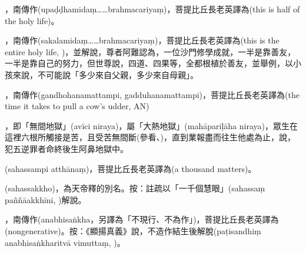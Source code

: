 \startitemgroup[noteitems]
\item{}，南傳作(upaḍḍhamidaṃ……brahmacariyaṃ)，菩提比丘長老英譯為(this is half of the holy life)。
\item{}，南傳作(sakalamidaṃ……brahmacariyaṃ)，菩提比丘長老英譯為(this is the entire holy life, )，並解說，尊者阿難認為，一位沙門修學成就，一半是靠善友，一半是靠自己的努力，但世尊說，四道、四果等，全都根植於善友，並舉例，以小孩來說，不可能說「多少來自父親，多少來自母親」。
\stopitemgroup

\startitemgroup[noteitems]
\item{}，南傳作(gandhohanamattampi, gadduhanamattampi)，菩提比丘長老英譯為(the time it takes to pull a cow's udder, AN)。「𤛓」：擠奶。
\stopitemgroup

\startitemgroup[noteitems]
\item{}，即「無間地獄」(avīci niraya)，屬「大熱地獄」(mahāpariḷāha niraya)，眾生在這裡六根所觸接是苦，且受苦無間斷(參看、)，直到業報盡而往生他處為止，說，犯五逆罪者命終後生阿鼻地獄中。
\stopitemgroup

\startitemgroup[noteitems]
\item{}(sahassampi atthānaṃ)，菩提比丘長老英譯為(a thousand matters)。
\item{}(sahassakkho)，為天帝釋的別名。按：註疏以「一千個慧眼」(sahassaṃ paññāakkhīni, )解說。
\stopitemgroup

\startitemgroup[noteitems]
\item{}，南傳作(anabhisaṅkha，另譯為「不現行、不為作」)，菩提比丘長老英譯為(nongenerative)。按：《顯揚真義》說，不造作結生後解脫(paṭisandhiṃ anabhisaṅkharitvā vimuttaṃ, )。
\stopitemgroup

